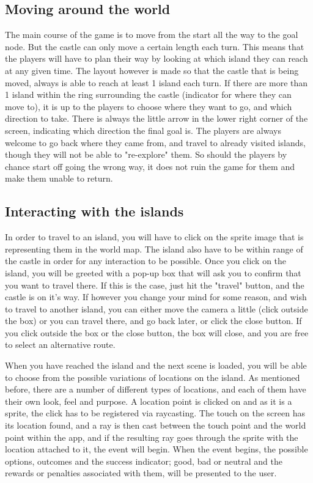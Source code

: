 \subsection{Moving around the world}
The main course of the game is to move from the start all the way to the goal node. But the castle can only move a certain length each turn. This means that the players will have to plan their way by looking at which island they can reach at any given time. The layout however is made so that the castle that is being moved, always is able to reach at least 1 island each turn. If there are more than 1 island within the ring surrounding the castle (indicator for where they can move to), it is up to the players to choose where they want to go, and which direction to take. There is always the little arrow in the lower right corner of the screen, indicating which direction the final goal is. The players are always welcome to go back where they came from, and travel to already visited islands, though they will not be able to "re-explore" them. So should the players by chance start off going the wrong way, it does not ruin the game for them and make them unable to return.

\subsection{Interacting with the islands}
In order to travel to an island, you will have to click on the sprite image that is representing them in the world map. The island also have to be within range of the castle in order for any interaction to be possible. 
Once you click on the island, you will be greeted with a pop-up box that will ask you to confirm that you want to travel there. If this is the case, just hit the "travel" button, and the castle is on it's way. If however you change your mind for some reason, and wish to travel to another island, you can either move the camera a little (click outside the box) or you can travel there, and go back later, or click the close button. If you click outside the box or the close button, the box will close, and you are free to select an alternative route.

When you have reached the island and the next scene is loaded, you will be able to choose from the possible variations of locations on the island. As mentioned before, there are a number of different types of locations, and each of them have their own look, feel and purpose.
A location point is clicked on and as it is a sprite, the click has to be registered via raycasting. The touch on the screen has its location found, and a ray is then cast between the touch point and the world point within the app, and if the resulting ray goes through the sprite with the location attached to it, the event will begin. When the event begins, the possible options, outcomes and the success indicator; good, bad or neutral and the rewards or penalties associated with them, will be presented to the user.

